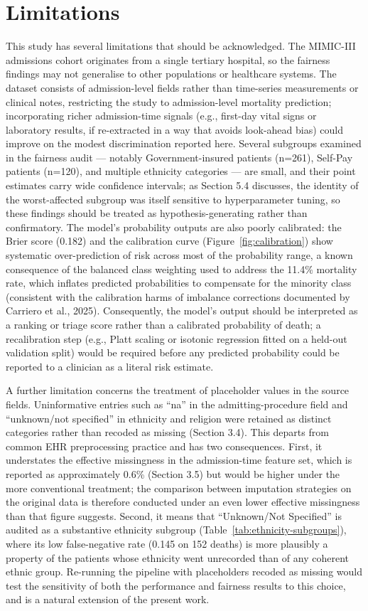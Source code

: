 \documentclass[12pt,a4paper]{report}
\begin{document}
\section{Limitations}
This study has several limitations that should be acknowledged. The MIMIC-III admissions cohort originates from a single tertiary hospital, so the fairness findings may not generalise to other populations or healthcare systems. The dataset consists of admission-level fields rather than time-series measurements or clinical notes, restricting the study to admission-level mortality prediction; incorporating richer admission-time signals (e.g., first-day vital signs or laboratory results, if re-extracted in a way that avoids look-ahead bias) could improve on the modest discrimination reported here. Several subgroups examined in the fairness audit --- notably Government-insured patients (n=261), Self-Pay patients (n=120), and multiple ethnicity categories --- are small, and their point estimates carry wide confidence intervals; as Section 5.4 discusses, the identity of the worst-affected subgroup was itself sensitive to hyperparameter tuning, so these findings should be treated as hypothesis-generating rather than confirmatory. The model's probability outputs are also poorly calibrated: the Brier score (0.182) and the calibration curve (Figure~\ref{fig:calibration}) show systematic over-prediction of risk across most of the probability range, a known consequence of the balanced class weighting used to address the 11.4\% mortality rate, which inflates predicted probabilities to compensate for the minority class (consistent with the calibration harms of imbalance corrections documented by Carriero et al., 2025). Consequently, the model's output should be interpreted as a ranking or triage score rather than a calibrated probability of death; a recalibration step (e.g., Platt scaling or isotonic regression fitted on a held-out validation split) would be required before any predicted probability could be reported to a clinician as a literal risk estimate.

A further limitation concerns the treatment of placeholder values in the source fields. Uninformative entries such as ``na'' in the admitting-procedure field and ``unknown/not specified'' in ethnicity and religion were retained as distinct categories rather than recoded as missing (Section 3.4). This departs from common EHR preprocessing practice and has two consequences. First, it understates the effective missingness in the admission-time feature set, which is reported as approximately 0.6\% (Section 3.5) but would be higher under the more conventional treatment; the comparison between imputation strategies on the original data is therefore conducted under an even lower effective missingness than that figure suggests. Second, it means that ``Unknown/Not Specified'' is audited as a substantive ethnicity subgroup (Table~\ref{tab:ethnicity-subgroups}), where its low false-negative rate (0.145 on 152 deaths) is more plausibly a property of the patients whose ethnicity went unrecorded than of any coherent ethnic group. Re-running the pipeline with placeholders recoded as missing would test the sensitivity of both the performance and fairness results to this choice, and is a natural extension of the present work.
\end{document}
